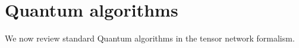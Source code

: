 \section{Quantum algorithms}

We now review standard Quantum algorithms in the tensor network formalism.




